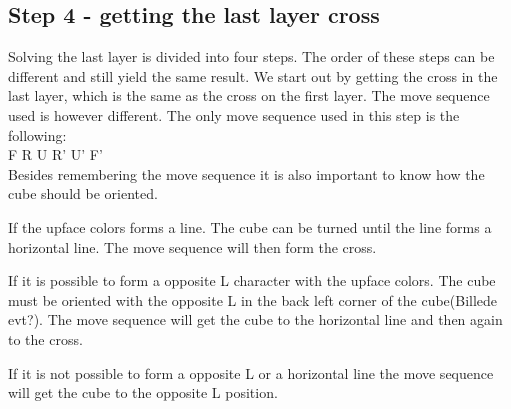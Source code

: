 \subsection{Step 4 - getting the last layer cross}
Solving the last layer is divided into four steps. The order of these steps can be different and still yield the same result. We start out by getting the cross in the last layer, which is the same as the cross on the first layer. The move sequence used is however different. The only move sequence used in this step is the following: \\

F R U R' U' F' \\

Besides remembering the move sequence it is also important to know how the cube should be oriented.

If the upface colors forms a line. The cube can be turned until the line forms a horizontal line. The move sequence will then form the cross.

If it is possible to form a opposite L character with the upface colors. The cube must be oriented with the opposite L in the back left corner of the cube(Billede evt?). The move sequence will get the cube to the horizontal line and then again to the cross.

If it is not possible to form a opposite L or a horizontal line the move sequence will get the cube to the opposite L position.

